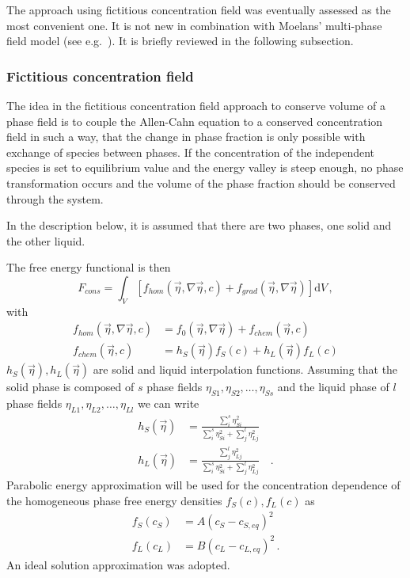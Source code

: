 	The approach using fictitious concentration field was eventually assessed as the most convenient one. It is not new in combination with Moelans' multi-phase field model (see e.g.~\cite{Yadav2016,Yadav2018vol_cons}). It is briefly reviewed in the following subsection. 
		
		\subsubsection{Fictitious concentration field}
		The idea in the fictitious concentration field approach to conserve volume of a phase field is to couple the Allen-Cahn equation to a conserved concentration field in such a way, that the change in phase fraction is only possible with exchange of species between phases. If the concentration of the independent species is set to equilibrium value and the energy valley is steep enough, no phase transformation occurs and the volume of the phase fraction should be conserved through the system. 
		
		In the description below, it is assumed that there are two phases, one solid and the other liquid.
		
		The free energy functional is then
		\begin{equation}
			F_{cons} = \int_V \left[ f_{hom}(\vec{\eta},\nabla\vec{\eta},c) + f_{grad}(\vec{\eta},\nabla\vec{\eta}) \right] \mathrm{d}V \,,
		\end{equation}
		with   
		\begin{align}
			f_{hom}(\vec{\eta},\nabla\vec{\eta},c)  &= f_0(\vec{\eta},\nabla\vec{\eta}) + f_{chem}(\vec{\eta},c) \\
			f_{chem}(\vec{\eta},c) &= h_S(\vec{\eta})f_S(c) + h_L(\vec{\eta})f_L(c)
		\end{align}
		$h_S(\vec{\eta}), h_L(\vec{\eta})$ are solid and liquid interpolation functions. Assuming that the solid phase is composed of $s$ phase fields $\eta_{S1},\eta_{S2},\dots,\eta_{Ss}$ and the liquid phase of $l$ phase fields $\eta_{L1},\eta_{L2},\dots,\eta_{Ll}$ we can write
		\begin{align}
			h_S(\vec{\eta}) &= \frac{\sum_i^s \eta_{Si}^2}{\sum_i^s \eta_{Si}^2 + \sum_j^l \eta_{Lj}^2}   \\
			h_L(\vec{\eta}) &= \frac{\sum_j^l \eta_{Lj}^2}{\sum_i^s \eta_{Si}^2 + \sum_j^l \eta_{Lj}^2} \quad .
		\end{align}
		Parabolic energy approximation will be used for the concentration dependence of the homogeneous phase free energy densities $f_S(c), f_L(c)$ as
		\begin{align}
			f_S(c_S) &= A(c_S-c_{S,eq})^2 \\
			f_L(c_L) &= B(c_L-c_{L,eq})^2 \,.
		\end{align}
		An ideal solution approximation was adopted.
		
